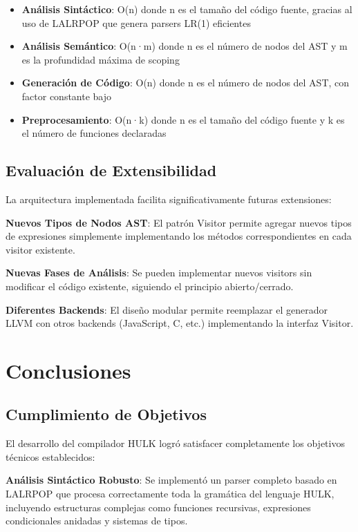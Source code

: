 \documentclass[12pt,a4paper]{article}
\begin{document}
\begin{itemize}
    \item \textbf{Análisis Sintáctico}: O(n) donde n es el tamaño del código fuente, gracias al uso de LALRPOP que genera parsers LR(1) eficientes
    \item \textbf{Análisis Semántico}: O(n·m) donde n es el número de nodos del AST y m es la profundidad máxima de scoping
    \item \textbf{Generación de Código}: O(n) donde n es el número de nodos del AST, con factor constante bajo
    \item \textbf{Preprocesamiento}: O(n·k) donde n es el tamaño del código fuente y k es el número de funciones declaradas
\end{itemize}

\subsection{Evaluación de Extensibilidad}

La arquitectura implementada facilita significativamente futuras extensiones:

\textbf{Nuevos Tipos de Nodos AST}: El patrón Visitor permite agregar nuevos tipos de expresiones simplemente implementando los métodos correspondientes en cada visitor existente.

\textbf{Nuevas Fases de Análisis}: Se pueden implementar nuevos visitors sin modificar el código existente, siguiendo el principio abierto/cerrado.

\textbf{Diferentes Backends}: El diseño modular permite reemplazar el generador LLVM con otros backends (JavaScript, C, etc.) implementando la interfaz Visitor.

\section{Conclusiones}

\subsection{Cumplimiento de Objetivos}

El desarrollo del compilador HULK logró satisfacer completamente los objetivos técnicos establecidos:

\textbf{Análisis Sintáctico Robusto}: Se implementó un parser completo basado en LALRPOP que procesa correctamente toda la gramática del lenguaje HULK, incluyendo estructuras complejas como funciones recursivas, expresiones condicionales anidadas y sistemas de tipos.
\end{document}
